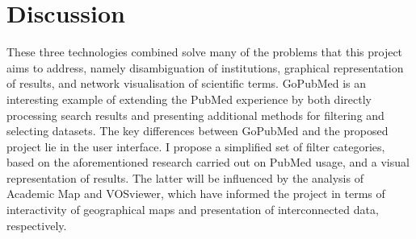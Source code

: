 \documentclass[PROP_AGutteridge_CS.tex]{subfiles}
\begin{document}

\section{Discussion}
These three technologies combined solve many of the problems that this project aims to address, namely disambiguation of institutions, graphical representation of results, and network visualisation of scientific terms. GoPubMed is an interesting example of extending the PubMed experience by both directly processing search results and presenting additional methods for filtering and selecting datasets. The key differences between GoPubMed and the proposed project lie in the user interface. I propose a simplified set of filter categories, based on the aforementioned research carried out on PubMed usage\cite{dogan}, and a visual representation of results. The latter will be influenced by the analysis of Academic Map and VOSviewer, which have informed the project in terms of interactivity of geographical maps and presentation of interconnected data, respectively. 
\end{document}
